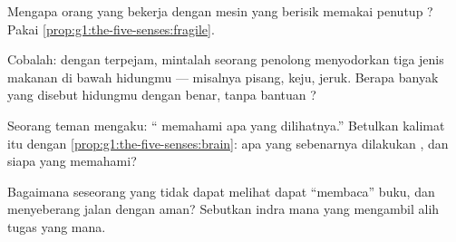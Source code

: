 \begin{exercise}[$\star$]\label{exo:g1:the-five-senses:7}
Mengapa orang yang bekerja dengan mesin yang berisik memakai penutup
? Pakai \cref{prop:g1:the-five-senses:fragile}.
\end{exercise}

\begin{exercise}[$\star$]\label{exo:g1:the-five-senses:8}
Cobalah: dengan  terpejam, mintalah seorang penolong menyodorkan
tiga jenis makanan di bawah hidungmu --- misalnya pisang, keju, jeruk.
Berapa banyak yang disebut hidungmu dengan benar, tanpa bantuan ?
\end{exercise}

\begin{exercise}[$\star\star$]\label{exo:g1:the-five-senses:9}
Seorang teman mengaku: `` memahami apa yang dilihatnya.''
Betulkan kalimat itu dengan \cref{prop:g1:the-five-senses:brain}: apa
yang sebenarnya dilakukan , dan siapa yang memahami?
\end{exercise}

\begin{exercise}[$\star\star$]\label{exo:g1:the-five-senses:10}
Bagaimana seseorang yang tidak dapat melihat dapat ``membaca'' buku,
dan menyeberang jalan dengan aman? Sebutkan indra mana yang mengambil
alih tugas yang mana.
\end{exercise}
